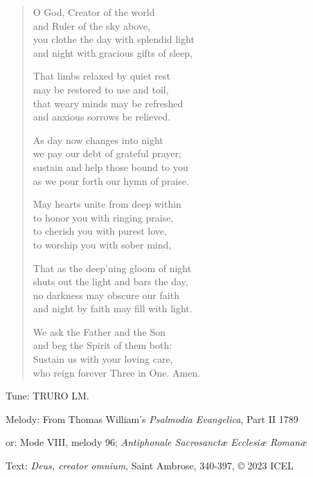 \hymn

\begin{verse}
O God, Creator of the world\\
and Ruler of the sky above,\\
you clothe the day with splendid light\\
and night with gracious gifts of sleep,

That limbs relaxed by quiet rest\\
may be restored to use and toil,\\
that weary minds may be refreshed\\
and anxious sorrows be relieved.

As day now changes into night\\
we pay our debt of grateful prayer;\\
sustain and help those bound to you\\
as we pour forth our hymn of praise.

May hearts unite from deep within\\
to honor you with ringing praise,\\
to cherish you with purest love,\\
to worship you with sober mind,

That as the deep’ning gloom of night\\
shuts out the light and bars the day,\\
no darkness may obscure our faith\\
and night by faith may fill with light.

We ask the Father and the Son\\
and beg the Spirit of them both:\\
Sustain us with your loving care,\\
who reign forever Three in One. Amen.
\end{verse}

\begin{hymnsource}
Tune: TRURO LM.

Melody: From Thomas William’s \emph{Psalmodia Evangelica}, Part II 1789

or: Mode VIII, melody 96; \emph{Antiphonale Sacrosanctæ Ecclesiæ Romanæ}

Text: \emph{Deus, creator omnium}, Saint Ambrose, 340-397, © 2023 ICEL
\end{hymnsource}